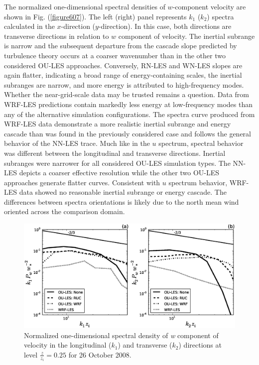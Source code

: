 The normalized one-dimensional spectral densities of $w$-component velocity are shown in Fig. (\autoref{figure607}). The left (right) panel represents $k_1$ ($k_2$) spectra calculated in the $x$-direction ($y$-direction). In this case, both directions are transverse directions in relation to $w$ component of velocity. The inertial subrange is narrow and the subsequent departure from the cascade slope predicted by turbulence theory occurs at a coarser wavenumber than in the other two considered OU-LES approaches. Conversely, RN-LES and WN-LES slopes are again flatter, indicating a broad range of energy-containing scales, the inertial subranges are narrow, and more energy is attributed to high-frequency modes. Whether the near-grid-scale data may be trusted remains a question. Data from WRF-LES predictions contain markedly less energy at low-frequency modes than any of the alternative simulation configurations. The spectra curve produced from WRF-LES data demonstrate a more realistic inertial subrange and energy cascade than was found in the previously considered case and follows the general behavior of the NN-LES trace. Much like in the $u$ spectrum, spectral behavior was different between the longitudinal and transverse directions. Inertial subranges were narrower for all considered OU-LES simulation types. The NN-LES depicts a coarser effective resolution while the other two OU-LES approaches generate flatter curves. Consistent with $u$ spectrum behavior, WRF-LES data showed no reasonable inertial subrange or energy cascade. The differences between spectra orientations is likely due to the north mean wind oriented across the comparison domain.


\begin{figure}[H]
\begin{center}
\includegraphics[width=\textwidth]{figures/chapter6/spectra1D_w_20081026}
\end{center}
\caption{Normalized one-dimensional spectral density of \textit{w} component of velocity in the longitudinal ($k_1$) and transverse ($k_2$) directions at level $\frac{z}{z_i}=0.25$ for 26 October 2008.}
\label{figure621}
\end{figure}



